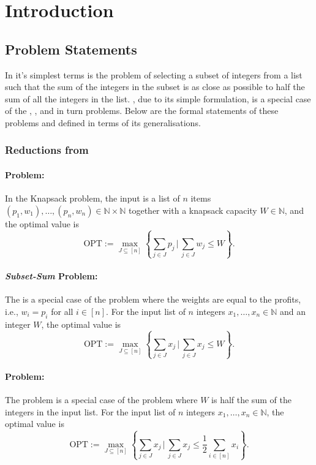 \section{Introduction}
\subsection{Problem Statements}
In it's simplest terms \Partition is the problem of selecting a subset of integers from a list such that the sum of the integers in the subset is as close as possible to half the sum of all the integers in the list. \Partition, due to its simple formulation, is a special case of the \MultPart, \SubsetSum, and in turn \Knapsack problems. 
Below are the formal statements of these problems and \Partition defined in terms of its generalisations.

\subsubsection{Reductions from \Knapsack}

\paragraph{\Knapsack Problem:}
In the Knapsack problem, the input is a list of \(n\) items \\ \((p_1, w_1), \ldots, (p_n, w_n) \in \mathbb{N} \times \mathbb{N}\) together with a knapsack capacity \(W \in \mathbb{N}\), and the optimal value is
\[
    \text{OPT} := \max_{J \subseteq [n]} \left\{ \sum_{j \in J} p_j \, \bigg| \, \sum_{j \in J} w_j \leq W \right\}.
\]

\paragraph{\textit{Subset-Sum} Problem:}
The \SubsetSum is a special case of the \Knapsack problem where the weights are equal to the profits, i.e., \(w_i = p_i\) for all \(i \in [n]\). For the input list of \(n\) integers \(x_1, \ldots, x_n \in \mathbb{N}\) and an integer \(W\), the optimal value is
\[
    \text{OPT} := \max_{J \subseteq [n]} \left\{ \sum_{j \in J} x_j \, \bigg| \, \sum_{j \in J} x_j \leq W \right\}.
\]

\paragraph{\Partition Problem:}
The \Partition problem is a special case of the \SubsetSum problem where \(W\) is half the sum of the integers in the input list. For the input list of \(n\) integers \(x_1, \ldots, x_n \in \mathbb{N}\), the optimal value is
\[
    \text{OPT} := \max_{J \subseteq [n]} \left\{ \sum_{j \in J} x_j \, \bigg| \, \sum_{j \in J} x_j \leq \frac{1}{2} \sum_{i \in [n]} x_i \right\}.
\]

